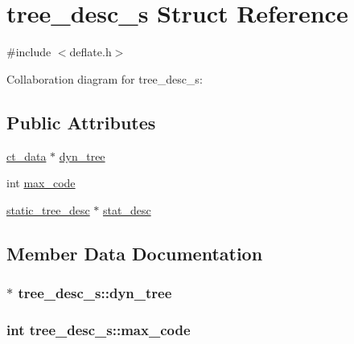 \hypertarget{structtree__desc__s}{}\section{tree\+\_\+desc\+\_\+s Struct Reference}
\label{structtree__desc__s}


{\ttfamily \#include $<$deflate.\+h$>$}



Collaboration diagram for tree\+\_\+desc\+\_\+s\+:
\subsection*{Public Attributes}
\begin{DoxyCompactItemize}
\item 
\hyperlink{deflate_8h_a0a4b5df3b2254c627b8a59e038963118}{ct\+\_\+data} $\ast$ \hyperlink{structtree__desc__s_a5c79989c018b96c729e88e41f98a4920}{dyn\+\_\+tree}
\item 
int \hyperlink{structtree__desc__s_a11f42f2c0464693def462dcfdd871002}{max\+\_\+code}
\item 
\hyperlink{deflate_8h_a905910aabf6aabbe79ff0832e4a664cc}{static\+\_\+tree\+\_\+desc} $\ast$ \hyperlink{structtree__desc__s_a7f237428776ee85058bb7f7f11900dd2}{stat\+\_\+desc}
\end{DoxyCompactItemize}


\subsection{Member Data Documentation}
\hypertarget{structtree__desc__s_a5c79989c018b96c729e88e41f98a4920}{}
\subsubsection[{dyn\+\_\+tree}]{$\ast$ tree\+\_\+desc\+\_\+s\+::dyn\+\_\+tree}\label{structtree__desc__s_a5c79989c018b96c729e88e41f98a4920}
\hypertarget{structtree__desc__s_a11f42f2c0464693def462dcfdd871002}{}
\subsubsection[{max\+\_\+code}]{\setlength{\rightskip}{0pt plus 5cm}int tree\+\_\+desc\+\_\+s\+::max\+\_\+code}\label{structtree__desc__s_a11f42f2c0464693def462dcfdd871002}
\hypertarget{structtree__desc__s_a7f237428776ee85058bb7f7f11900dd2}{}
